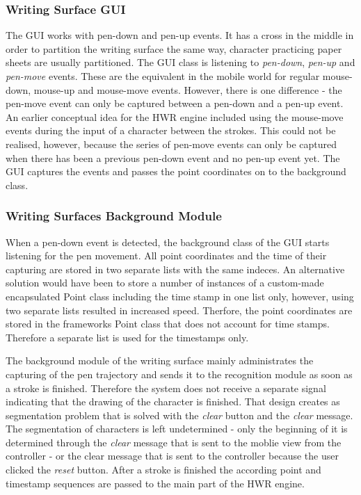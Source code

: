 \subsubsection{Writing Surface GUI}
\label{sec:hwre:writingsurfacegui}
The GUI works with pen-down and pen-up events. It has a cross in the middle in 
order to partition the writing surface the same way, character practicing paper 
sheets are usually partitioned. The GUI class is listening to \emph{pen-down}, 
\emph{pen-up} and \emph{pen-move} events. These are the equivalent in the mobile
world for regular mouse-down, mouse-up and mouse-move events. However, there is 
one difference - the pen-move event can only be captured between a pen-down and a
pen-up event. An earlier conceptual idea for the HWR engine included using the
mouse-move events during the input of a character between the strokes. This 
could not be realised, however, because the series of pen-move events can only 
be captured when there has been a previous pen-down event and no pen-up event 
yet. The GUI captures the events and passes the point coordinates on to 
the background class.

\subsubsection{Writing Surfaces Background Module}
\label{sec:hwre:writingsurfacebackground}

When a pen-down event is detected, the background class of the GUI starts 
listening for the pen movement. All point coordinates and the time of their 
capturing are stored in two separate lists with the same indeces.
An alternative solution would have been to store a number of instances of a 
custom-made encapsulated Point class including the time stamp in one list only, 
however, using two separate lists resulted in increased speed.
Therfore, the point coordinates are stored in the frameworks Point class that 
does not account for time stamps. Therefore a separate list is used for the 
timestamps only.

The background module of the writing surface mainly administrates the capturing 
of the pen trajectory and sends it to the recognition module as soon as a 
stroke is finished. Therefore the system does not receive a separate signal 
indicating that the drawing of the character is finished. That design creates 
as segmentation problem that is solved with the \emph{clear} button and the 
\emph{clear} message. The segmentation of characters is left undetermined - only 
the beginning of it is determined through the \emph{clear} message that is sent 
to the moblie view from the controller - or the clear message that is sent to 
the controller because the user clicked the \emph{reset} button.
After a stroke is finished the according point and timestamp sequences are 
passed to the main part of the HWR engine. 

